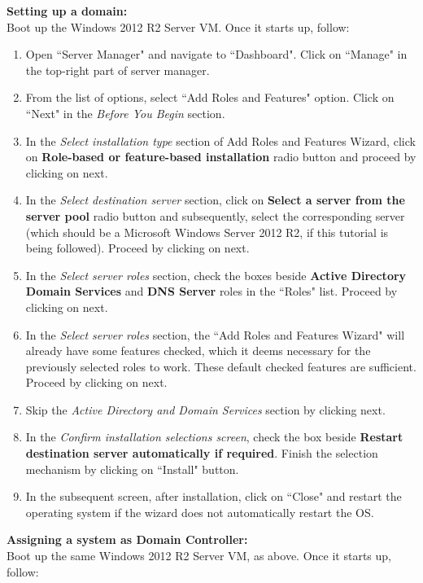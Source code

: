 \documentclass[12pt]{extarticle}
\begin{document}
\noindent
\textbf{Setting up a domain:}\\
Boot up the Windows 2012 R2 Server VM. Once it starts up, follow:

\begin{enumerate}
	\item Open ``Server Manager" and navigate to ``Dashboard". Click on ``Manage" in the top-right part of server manager.
	\item From the list of options, select ``Add Roles and Features" option. Click on ``Next" in the \textit{Before You Begin} section. 
	\item In the \textit{Select installation type} section of Add Roles and Features Wizard, click on \textbf{Role-based or feature-based installation} radio button and proceed by clicking on next.
	\item In the \textit{Select destination server} section, click on \textbf{Select a server from the server pool} radio button and subsequently, select the corresponding server (which should be a Microsoft Windows Server 2012 R2, if this tutorial is being followed). Proceed by clicking on next.
	\item In the \textit{Select server roles} section, check the boxes beside \textbf{Active Directory Domain Services} and \textbf{DNS Server} roles in the ``Roles" list. Proceed by clicking on next.
	\item In the \textit{Select server roles} section, the ``Add Roles and Features Wizard" will already have some features checked, which it deems necessary for the previously selected roles to work. These default checked features are sufficient. Proceed by clicking on next.
	\item Skip the \textit{Active Directory and Domain Services} section by clicking next.
	\item In the \textit{Confirm installation selections screen}, check the box beside \textbf{Restart destination server automatically if required}. Finish the selection mechanism by clicking on ``Install" button.
	\item In the subsequent screen, after installation, click on ``Close" and restart the operating system if the wizard does not automatically restart the OS.
\end{enumerate}

\vspace{4mm}
\noindent
\textbf{Assigning a system as Domain Controller:}\\
Boot up the same Windows 2012 R2 Server VM, as above. Once it starts up, follow:
\end{document}
